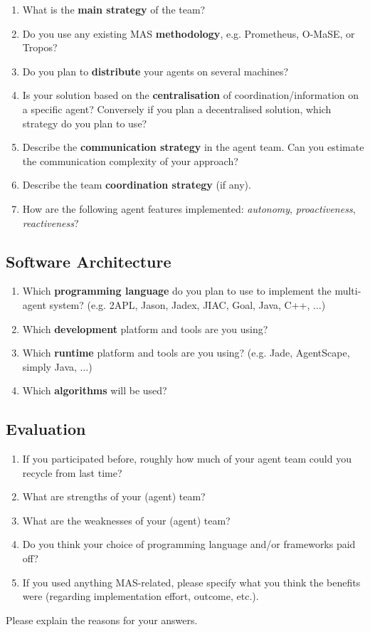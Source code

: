 \documentclass{article}
\begin{document}
\begin{enumerate}
  \item What is the \textbf{main strategy} of the team?
  \item Do you use any existing MAS \textbf{methodology}, e.g. Prometheus, O-MaSE, or Tropos?
  \item Do you plan to \textbf{distribute} your agents on several machines?
  \item Is your solution based on the \textbf{centralisation} of
   coordination/information on a specific agent? Conversely if you
   plan a decentralised solution, which strategy do you plan to use?
  \item Describe the \textbf{communication strategy} in the agent team. Can you
   estimate the communication complexity of your approach?
  \item Describe the team \textbf{coordination strategy} (if any).
  \item How are the following agent features implemented:
   \emph{autonomy}, \emph{proactiveness}, \emph{reactiveness}?
\end{enumerate}

\subsection*{Software Architecture}

\begin{enumerate}
  \item Which \textbf{programming language} do you plan to use to implement the
    multi-agent system? (e.g. 2APL, Jason, Jadex, JIAC, Goal, Java, C++, $\ldots$)
  \item Which \textbf{development} platform and tools are you using?
  \item Which \textbf{runtime} platform and tools are you using?
    (e.g. Jade, AgentScape, simply Java, $\ldots$)
  \item Which \textbf{algorithms} will be used?
\end{enumerate}

\subsection*{Evaluation}

\begin{enumerate}
  \item If you participated before, roughly how much of your agent team could you recycle from last time?
  \item What are strengths of your (agent) team?
  \item What are the weaknesses of your (agent) team?
  \item Do you think your choice of programming language and/or frameworks paid off?
  \item If you used anything MAS-related, please specify what you think the benefits were (regarding implementation effort, outcome, etc.).
\end{enumerate}

Please explain the reasons for your answers.
\end{document}
